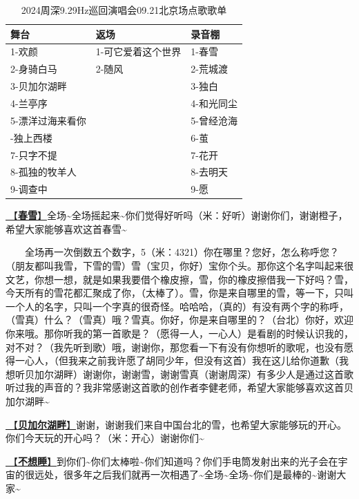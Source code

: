\documentclass[]{ctexbook}
\begin{document}
\begin{table}

\caption{\label{tab:unnamed-chunk-85}2024周深9.29Hz巡回演唱会09.21北京场点歌歌单}
\centering
\begin{tabular}[t]{lll}
\toprule
舞台 & 返场 & 录音棚\\
\midrule
1-欢颜 & 1-可它爱着这个世界 & 1-春雪\\
2-身骑白马 & 2-随风 & 2-荒城渡\\
3-贝加尔湖畔 &  & 3-独白\\
4-兰亭序 &  & 4-和光同尘\\
5-漂洋过海来看你 &  & 5-曾经沧海\\
\addlinespace
6-独上西楼 &  & 6-茧\\
7-只字不提 &  & 7-花开\\
8-孤独的牧羊人 &  & 8-去明天\\
9-调查中 &  & 9-愿\\
\bottomrule
\end{tabular}
\end{table}

\hyperref[spring-snow]{🎵【\textbf{春雪}】}全场\textasciitilde 全场摇起来\textasciitilde 你们觉得好听吗（米：好听）谢谢你们，谢谢橙子，希望大家能够喜欢这首春雪\textasciitilde{}

  全场再一次倒数五个数字，5（米：4321）你在哪里？您好，怎么称呼您？（朋友都叫我雪，下雪的雪）雪（宝贝，你好）宝你个头。那你这个名字叫起来很文艺，你想一想，就是如果我要借个橡皮擦，雪，你的橡皮擦借我一下好吗？雪，今天所有的雪花都汇聚成了你，（太棒了）。雪，你是来自哪里的雪，等一下，只叫一个人的名字，只叫一个字真的很奇怪。哈哈哈，（真的）有没有两个字的称呼，（雪真）什么？（雪真）哦？雪真。你好，你是来自哪里的？（台北）你好，欢迎你来哦。那你听我的第一首歌是？（愿得一人，一心人）是看剧的时候认识我的，对不对？（我先听到歌）哦，谢谢你，那您看一下有没有你想听的歌呢，也没有愿得一心人，（但我来之前我许愿了胡同少年，但没有这首）我在这儿给你道歉（我想听贝加尔湖畔）谢谢你，谢谢雪，谢谢雪真（谢谢周深）有多少人是通过这首歌听过我的声音的？我非常感谢这首歌的创作者李健老师，希望大家能够喜欢这首贝加尔湖畔\textasciitilde{}

\hyperref[lake-baikal]{🎵【\textbf{贝加尔湖畔}】}谢谢，谢谢我们来自中国台北的雪，也希望大家能够玩的开心。你们今天玩的开心吗？（米：开心）谢谢你们\textasciitilde{}

\hyperref[keep-playing]{🎵【\textbf{不想睡}】}到你们\textasciitilde 你们太棒啦\textasciitilde 你们知道吗？你们手电筒发射出来的光子会在宇宙的很远处，很多年之后我们就再一次相遇了\textasciitilde 全场\textasciitilde 全场\textasciitilde 你们是最棒的\textasciitilde 谢谢大家\textasciitilde{}
\end{document}
